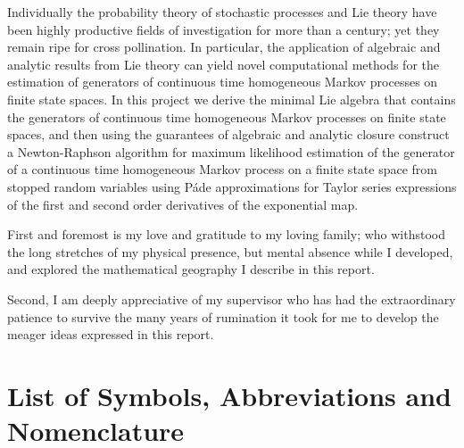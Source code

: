 \documentclass[12pt]{ucalgthes1}
\theoremstyle{definition}\newtheorem{definition}{Definition}
\begin{document}
	\newpage
	Individually the probability theory of stochastic processes and Lie theory 
	have been highly productive fields of investigation for more than a century; 
	yet they remain ripe for cross pollination. In particular, the application of 
	algebraic and analytic results from Lie theory can yield novel computational 
	methods for the estimation of generators of continuous time homogeneous Markov 
	processes on finite state spaces. In this project we derive the minimal Lie 
	algebra that contains the generators of continuous time homogeneous Markov 
	processes on finite state spaces, and then using the guarantees of algebraic 
	and analytic closure construct a Newton-Raphson algorithm for maximum 
	likelihood estimation of the generator of a continuous time homogeneous Markov 
	process on a finite state space from stopped random variables using P\'ade 
	approximations for Taylor series expressions of the first and second order 
	derivatives of the exponential map.

	\newpage
	First and foremost is my love and gratitude to my loving family; who 
	withstood the long stretches of my physical presence, but mental absence while 
	I developed, and explored the mathematical geography I describe in this 
	report.
	
	Second, I am deeply appreciative of my supervisor who has had the 
	extraordinary patience to survive the many years of rumination it took for me 
	to develop the meager ideas expressed in this report.

	\begin{singlespace}
		\newpage
		\tableofcontents
		\pagestyle{plain}
		\newpage
		\listoftables
		\pagestyle{plain}
		\newpage
		\listoffigures
		\pagestyle{plain}
		\newpage
		\listofalgorithms
		\pagestyle{plain}
		\clearpage
		\clearpage
	\end{singlespace}
	\newpage
	\chapter*{\bf{List of Symbols, Abbreviations and Nomenclature}\hfill} 
	\listofsymbols
	\pagestyle{plain}
	\clearpage

	
	
	
	
	
	 
	
	\appendix
	
\end{document}
